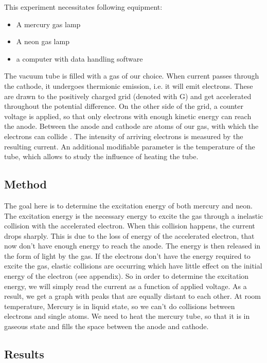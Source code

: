 \documentclass{scrartcl}
\begin{document}
This experiment necessitates following equipment:

\begin{itemize}
    \item A mercury gas lamp
    \item A neon gas lamp
    \item a computer with data handling software
\end{itemize}

\noindent The vacuum tube is filled with a gas of our choice. When current passes through the cathode, it undergoes thermionic emission, i.e. it will emit electrons. These are drawn to the positively charged grid (denoted with G) and get accelerated throughout the potential difference. On the other side of the grid, a counter voltage is applied, so that only electrons with enough kinetic energy can reach the anode. Between the anode and cathode are atoms of our gas, with which the electrons can collide \cite{Franck}. The intensity of arriving electrons is measured by the resulting current. An additional modifiable parameter is the temperature of the tube, which allows to study the influence of heating the tube.

\subsection{Method}
The goal here is to determine the excitation energy of both mercury and neon. The excitation energy is the necessary energy to excite the gas through a inelastic collision with the accelerated electron. When this collision happens, the current drops sharply. This is due to the loss of energy of the accelerated electron, that now don't have enough energy to reach the anode. The energy is then released in the form of light by the gas. If the electrons don't have the energy required to excite the gas, elastic collisions are occurring which have little effect on the initial energy of the electron (see appendix).
So in order to determine the excitation energy, we will simply read the current as a function of applied voltage. As a result, we get a graph with peaks that are equally distant to each other.
At room temperature, Mercury is in liquid state, so we can't do collisions between electrons and single atoms. We need to heat the mercury tube, so that it is in gaseous state and fills the space between the anode and cathode.

\subsection{Results}
\end{document}
